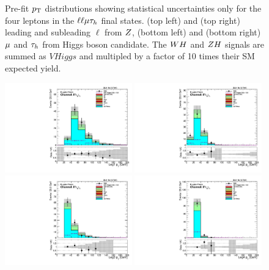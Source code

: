 \begin{figure}[htbp]
     \caption{
Pre-fit $p_\mathrm{T}$ distributions showing statistical uncertainties only for the 
four leptons in the $\ell\ell\mu\tau_{h}$ final states.
(top left) and (top right) leading and subleading $\ell$ from $Z$,
(bottom left) and (bottom right) $\mu$ and $\tau_{h}$ from Higgs boson candidate.
The $WH$ and $ZH$ signals are summed as $VHiggs$ and multipled by a factor of
10 times their SM expected yield.
     }
     \label{fig:llmt_pts}
\end{figure}

\begin{figure}[htbp]
\centering
     \includegraphics[width=0.49\textwidth]{higgs_to_taus_vh/plots/zh/fr_OS_control/LLTT/pt_1.pdf}
     \includegraphics[width=0.49\textwidth]{higgs_to_taus_vh/plots/zh/fr_OS_control/LLTT/pt_2.pdf}
     \includegraphics[width=0.49\textwidth]{higgs_to_taus_vh/plots/zh/fr_OS_control/LLTT/pt_3.pdf}
     \includegraphics[width=0.49\textwidth]{higgs_to_taus_vh/plots/zh/fr_OS_control/LLTT/pt_4.pdf}

\end{figure}
